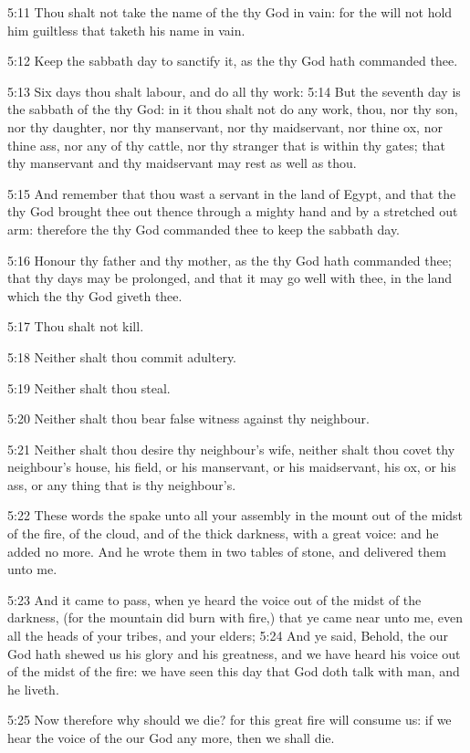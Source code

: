 5:11 Thou shalt not take the name of the \LORD thy God in vain: for the \LORD will not hold him guiltless that taketh his name in vain.

5:12 Keep the sabbath day to sanctify it, as the \LORD thy God hath commanded thee.

5:13 Six days thou shalt labour, and do all thy work: 5:14 But the seventh day is the sabbath of the \LORD thy God: in it thou shalt not do any work, thou, nor thy son, nor thy daughter, nor thy manservant, nor thy maidservant, nor thine ox, nor thine ass, nor any of thy cattle, nor thy stranger that is within thy gates; that thy manservant and thy maidservant may rest as well as thou.

5:15 And remember that thou wast a servant in the land of Egypt, and that the \LORD thy God brought thee out thence through a mighty hand and by a stretched out arm: therefore the \LORD thy God commanded thee to keep the sabbath day.

5:16 Honour thy father and thy mother, as the \LORD thy God hath commanded thee; that thy days may be prolonged, and that it may go well with thee, in the land which the \LORD thy God giveth thee.

5:17 Thou shalt not kill.

5:18 Neither shalt thou commit adultery.

5:19 Neither shalt thou steal.

5:20 Neither shalt thou bear false witness against thy neighbour.

5:21 Neither shalt thou desire thy neighbour's wife, neither shalt thou covet thy neighbour's house, his field, or his manservant, or his maidservant, his ox, or his ass, or any thing that is thy neighbour's.

5:22 These words the \LORD spake unto all your assembly in the mount out of the midst of the fire, of the cloud, and of the thick darkness, with a great voice: and he added no more. And he wrote them in two tables of stone, and delivered them unto me.

5:23 And it came to pass, when ye heard the voice out of the midst of the darkness, (for the mountain did burn with fire,) that ye came near unto me, even all the heads of your tribes, and your elders; 5:24 And ye said, Behold, the \LORD our God hath shewed us his glory and his greatness, and we have heard his voice out of the midst of the fire: we have seen this day that God doth talk with man, and he liveth.

5:25 Now therefore why should we die? for this great fire will consume us: if we hear the voice of the \LORD our God any more, then we shall die.


